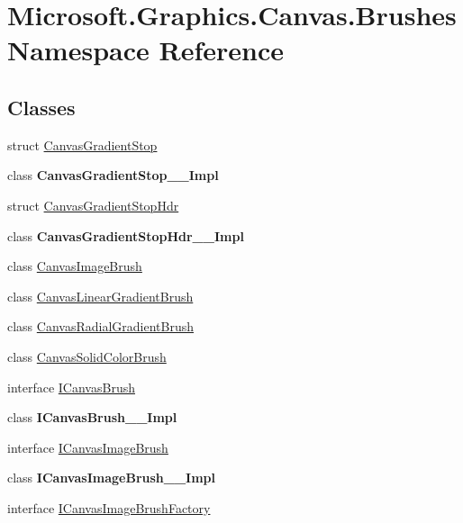 \hypertarget{namespace_microsoft_1_1_graphics_1_1_canvas_1_1_brushes}{}\section{Microsoft.\+Graphics.\+Canvas.\+Brushes Namespace Reference}
\label{namespace_microsoft_1_1_graphics_1_1_canvas_1_1_brushes}
\subsection*{Classes}
\begin{DoxyCompactItemize}
\item 
struct \hyperlink{struct_microsoft_1_1_graphics_1_1_canvas_1_1_brushes_1_1_canvas_gradient_stop}{Canvas\+Gradient\+Stop}
\item 
class {\bfseries Canvas\+Gradient\+Stop\+\_\+\+\_\+\+Impl}
\item 
struct \hyperlink{struct_microsoft_1_1_graphics_1_1_canvas_1_1_brushes_1_1_canvas_gradient_stop_hdr}{Canvas\+Gradient\+Stop\+Hdr}
\item 
class {\bfseries Canvas\+Gradient\+Stop\+Hdr\+\_\+\+\_\+\+Impl}
\item 
class \hyperlink{class_microsoft_1_1_graphics_1_1_canvas_1_1_brushes_1_1_canvas_image_brush}{Canvas\+Image\+Brush}
\item 
class \hyperlink{class_microsoft_1_1_graphics_1_1_canvas_1_1_brushes_1_1_canvas_linear_gradient_brush}{Canvas\+Linear\+Gradient\+Brush}
\item 
class \hyperlink{class_microsoft_1_1_graphics_1_1_canvas_1_1_brushes_1_1_canvas_radial_gradient_brush}{Canvas\+Radial\+Gradient\+Brush}
\item 
class \hyperlink{class_microsoft_1_1_graphics_1_1_canvas_1_1_brushes_1_1_canvas_solid_color_brush}{Canvas\+Solid\+Color\+Brush}
\item 
interface \hyperlink{interface_microsoft_1_1_graphics_1_1_canvas_1_1_brushes_1_1_i_canvas_brush}{I\+Canvas\+Brush}
\item 
class {\bfseries I\+Canvas\+Brush\+\_\+\+\_\+\+Impl}
\item 
interface \hyperlink{interface_microsoft_1_1_graphics_1_1_canvas_1_1_brushes_1_1_i_canvas_image_brush}{I\+Canvas\+Image\+Brush}
\item 
class {\bfseries I\+Canvas\+Image\+Brush\+\_\+\+\_\+\+Impl}
\item 
interface \hyperlink{interface_microsoft_1_1_graphics_1_1_canvas_1_1_brushes_1_1_i_canvas_image_brush_factory}{I\+Canvas\+Image\+Brush\+Factory}

\end{DoxyCompactItemize}

